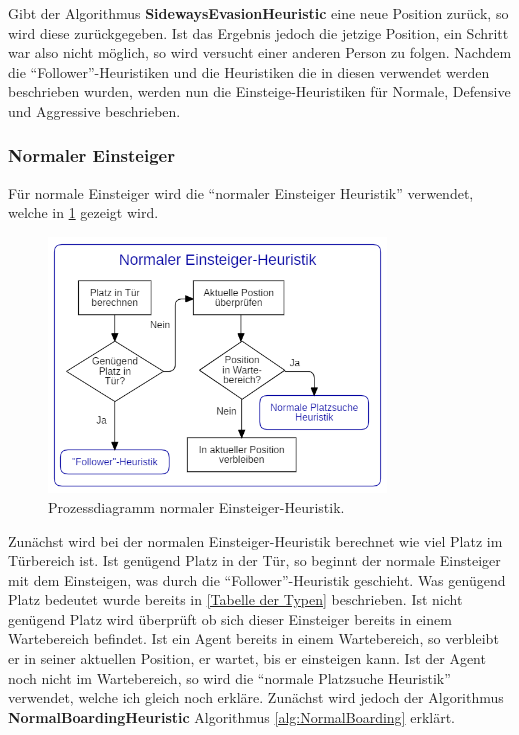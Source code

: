 Gibt der Algorithmus \textbf{SidewaysEvasionHeuristic} eine neue Position zurück, so wird diese zurückgegeben. Ist das Ergebnis jedoch die jetzige Position, ein Schritt war also nicht möglich, so wird versucht einer anderen Person zu folgen.
Nachdem die "`Follower"'-Heuristiken und die Heuristiken die in diesen verwendet werden beschrieben wurden, werden nun die Einsteige-Heuristiken für Normale, Defensive und Aggressive beschrieben.

\subsubsection{Normaler Einsteiger} 
Für normale Einsteiger wird die "`normaler Einsteiger Heuristik"' verwendet, welche in \figurename \ref{fig:NEH} gezeigt wird.
\begin{figure}[H]
	\centering
		\includegraphics[width=0.8\textwidth]{pictures/model/algorithm/boarding/normal_boarding/normal_boarding_heuristic.png}
	\caption{Prozessdiagramm normaler Einsteiger-Heuristik.}
	\label{fig:NEH}
\end{figure}
Zunächst wird bei der normalen Einsteiger-Heuristik berechnet wie viel Platz im Türbereich ist. Ist genügend Platz in der Tür, so beginnt der normale Einsteiger mit dem Einsteigen, was durch die "`Follower"'-Heuristik geschieht. Was genügend Platz bedeutet wurde bereits in \ref{Tabelle der Typen} beschrieben. Ist nicht genügend Platz wird überprüft ob sich dieser Einsteiger bereits in einem Wartebereich befindet. Ist ein Agent bereits in einem Wartebereich, so verbleibt er in seiner aktuellen Position, er wartet, bis er einsteigen kann. Ist der Agent noch nicht im Wartebereich, so wird die "`normale Platzsuche Heuristik"' verwendet, welche ich gleich noch erkläre. Zunächst wird jedoch der Algorithmus \textbf{NormalBoardingHeuristic} Algorithmus \ref{alg:NormalBoarding} erklärt. 
\clearpage

